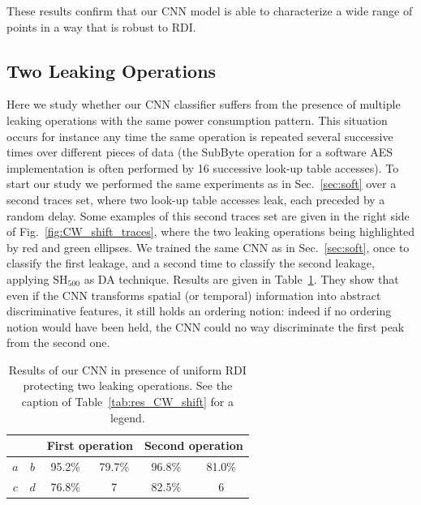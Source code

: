 These results confirm that our CNN model is able to characterize a wide range of points in a way that is robust to RDI. 

\subsection{Two Leaking Operations}
Here we study whether our CNN classifier suffers from the presence of multiple leaking operations with the same power consumption pattern. This situation occurs for instance any time the same operation is repeated several successive times over different pieces of data (\eg the SubByte operation for a software AES implementation is often performed by 16 successive look-up table accesses). To start our study we performed the same experiments as in Sec.~\ref{sec:soft} over a second traces set, where two look-up table accesses leak, each preceded by a random delay. Some examples of this second traces set are given in the right side of Fig.~\ref{fig:CW_shift_traces}, where the two leaking operations being highlighted by red and green ellipses. We trained the same CNN as in Sec.~\ref{sec:soft}, once to classify the first leakage, and a second time to classify the second leakage, applying $\mathrm{SH}_{500}$ as DA technique. Results are given in Table~\ref{tab:label}. They show that even if the CNN transforms spatial (or temporal) information into abstract discriminative features, it still holds an ordering notion: indeed if no ordering notion would have been held, the CNN could no way discriminate the first peak from the second one. 


\begin{table}[]
\centering
\caption[Results of our CNN in presence of uniform RDI protecting two leaking operations.]{Results of our CNN in presence of uniform RDI protecting two leaking operations. See the caption of Table~\ref{tab:res_CW_shift} for a legend.}
\label{tab:label}
\begin{tabular}{|c|c|c|c|c|c|}
\hline
\multicolumn{2}{|c|}{} & \multicolumn{2}{c|}{First operation} & \multicolumn{2}{c|}{Second operation} \\ \hline
$a$        & $b$       & 95.2\%            & 79.7\%           & 96.8\%            & 81.0\%            \\ \hline
$c$        & $d$       & 76.8\%            & 7                & 82.5\%            & 6                 \\ \hline
\end{tabular}
\end{table}




